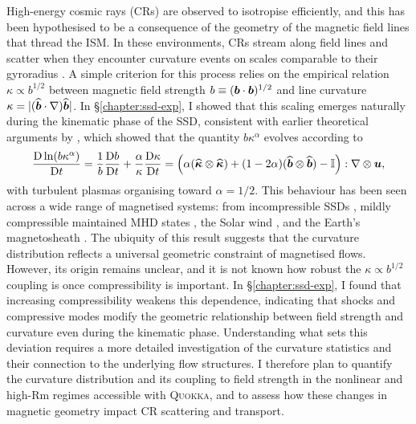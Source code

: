 High-energy cosmic rays (CRs) are observed to isotropise efficiently, and this has been hypothesised to be a consequence of the geometry of the magnetic field lines that thread the ISM. In these environments, CRs stream along field lines and scatter when they encounter curvature events on scales comparable to their gyroradius \citep{kempski2023cosmic, Lemoine2023_field_reversal_CR_transport}. A simple criterion for this process relies on the empirical relation $\kappa \propto b^{1/2}$ between magnetic field strength $b \equiv (\bm{b}\cdot\bm{b})^{1/2}$ and line curvature $\kappa = |(\widehat{\bm{b}}\cdot\nabla)\widehat{\bm{b}}|$. In \S\ref{chapter:ssd-exp}, I showed that this scaling emerges naturally during the kinematic phase of the SSD, consistent with earlier theoretical arguments by \citet{schekochihin2004simulations}, which showed that the quantity $b \kappa^{\alpha}$ evolves according to
\begin{align}
    \frac{\mathrm{D} \ln(b \kappa^\alpha)}{\mathrm{D} t}
        = \frac{1}{b}\frac{\mathrm{D} b}{\mathrm{D} t} + \frac{\alpha}{\kappa}\frac{\mathrm{D} \kappa}{\mathrm{D} t}
        = \left( 
                \alpha (\widehat{\bm{\kappa}}\otimes\widehat{\bm{\kappa}})
                + (1 - 2\alpha) (\widehat{\bm{b}}\otimes\widehat{\bm{b}})
                - \mathbb{I}
             \right):\nabla\otimes\bm{u},
\end{align}
with turbulent plasmas organising toward $\alpha = 1/2$. This behaviour has been seen across a wide range of magnetised systems: from incompressible SSDs \citep{schekochihin2004simulations}, mildly compressible maintained MHD states \citep{yuen2020curvature}, the Solar wind \citep{huang2020observations, bandyopadhyay2020situ, hu2025interplanetary}, and the Earth's magnetosheath \citep{ji2022curvature}. The ubiquity of this result suggests that the curvature distribution reflects a universal geometric constraint of magnetised flows. However, its origin remains unclear, and it is not known how robust the $\kappa \propto b^{1/2}$ coupling is once compressibility is important. In \S\ref{chapter:ssd-exp}, I found that increasing compressibility weakens this dependence, indicating that shocks and compressive modes modify the geometric relationship between field strength and curvature even during the kinematic phase. Understanding what sets this deviation requires a more detailed investigation of the curvature statistics and their connection to the underlying flow structures. I therefore plan to quantify the curvature distribution and its coupling to field strength in the nonlinear and high-$\mathrm{Rm}$ regimes accessible with \textsc{Quokka}, and to assess how these changes in magnetic geometry impact CR scattering and transport.

